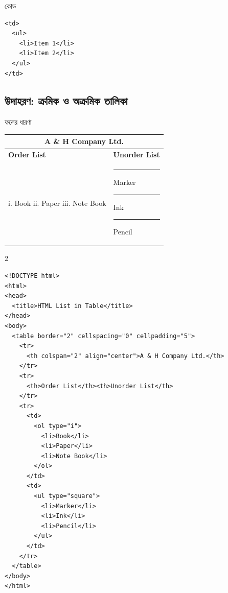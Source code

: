 \begin{examplebox}{কোড}
\begin{verbatim}
<td>
  <ul>
    <li>Item 1</li>
    <li>Item 2</li>
  </ul>
</td>
\end{verbatim}
\end{examplebox}

\subsection{উদাহরণ: ক্রমিক ও অক্রমিক তালিকা}

\begin{examplebox}{ফলের ধারণা}
\begin{center}
\begin{tabular}{|p{}|p{}|}
\hline
\multicolumn{2}{|c|}{\textbf{A \& H Company Ltd.}} \\
\hline
\textbf{Order List} & \textbf{Unorder List} \\
\hline
i. Book \newline ii. Paper \newline iii. Note Book & \rule{.6ex}{.6ex} Marker \newline \rule{.6ex}{.6ex} Ink \newline \rule{.6ex}{.6ex} Pencil \\
\hline
\end{tabular}
\end{center}
\end{examplebox}

\par{}\par
\begin{multicols}{2}
\begin{verbatim}
<!DOCTYPE html>
<html>
<head>
  <title>HTML List in Table</title>
</head>
<body>
  <table border="2" cellspacing="0" cellpadding="5">
    <tr>
      <th colspan="2" align="center">A & H Company Ltd.</th>
    </tr>
    <tr>
      <th>Order List</th><th>Unorder List</th>
    </tr>
    <tr>
      <td>
        <ol type="i">
          <li>Book</li>
          <li>Paper</li>
          <li>Note Book</li>
        </ol>
      </td>
      <td>
        <ul type="square">
          <li>Marker</li>
          <li>Ink</li>
          <li>Pencil</li>
        </ul>
      </td>
    </tr>
  </table>
</body>
</html>
\end{verbatim}
\end{multicols}


